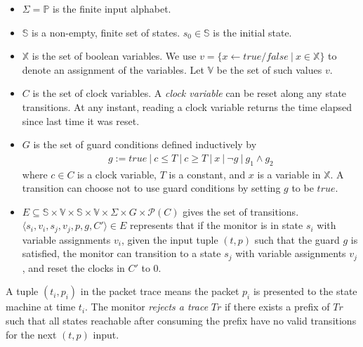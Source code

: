 \begin{definition}[Monitor]
  \begin{itemize}
    \item $\Sigma = \mathbb{P}$ is the finite input alphabet.

    \item $\mathbb{S}$ is a non-empty, finite set of states. $s_0 \in
      \mathbb{S}$ is the initial state.

    \item $\mathbb{X}$ is the set of boolean variables. We use $v = \{x
      \leftarrow true/false\ |\ x \in \mathbb{X}\}$ to denote an assignment of
      the variables. Let $\mathbb{V}$ be the set of such values $v$. 

    \item $C$ is the set of clock variables. A \textit{clock variable} can be
      reset along any state transitions. At any instant, reading a clock
      variable returns the time elapsed since last time it was reset.

    \item $G$ is the set of guard conditions defined inductively by
      \begin{align*}
        g := true\ |\ c \le T\ |\ c \ge T\ |\ x\ |\ \neg g\ |\ g_1 \land g_2
      \end{align*}%
      where $c \in C$ is a clock variable, $T$ is a constant, and $x$ is a
      variable in $\mathbb{X}$.  A transition can choose not to use guard
      conditions by setting $g$ to be $true$.

    \item $E \subseteq \mathbb{S} \times \mathbb{V} \times \mathbb{S} \times
      \mathbb{V} \times \Sigma \times  G \times \mathscr{P}(C)$ gives the set of
      transitions.\\ $\langle s_i, v_i, s_j, v_j, p, g, C'\rangle \in E$
      represents that if the monitor is in state $s_i$ with variable assignments
      $v_i$, given the input tuple $(t, p)$ such that the guard $g$ is
      satisfied, the monitor can transition to a state $s_j$ with variable assignments
      $v_j$, and reset the clocks in $C'$ to 0.
  \end{itemize}
  \label{def:sm}
\end{definition}

A tuple $(t_i, p_i)$ in the packet trace means the packet $p_i$ is presented to
the state machine at time $t_i$. The monitor {\it rejects a trace} $Tr$ if there
exists a prefix of $Tr$ such that all states reachable after consuming the
prefix have no valid transitions for the next $(t, p)$ input.

